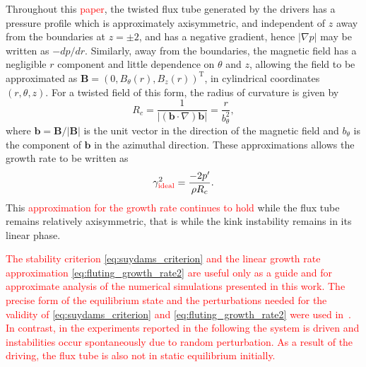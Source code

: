 \documentclass[12pt]{article}
\newcommand{\rs}[2]{\textcolor{red}{#2}}
\renewcommand{\vec}[1]{{\bm #1}}
\begin{document}
Throughout this \rs{chapter}{paper}, the twisted flux tube generated by the drivers has a pressure profile which is approximately axisymmetric, and independent of $z$ away from the boundaries at $z=\pm2$, and has a negative gradient, hence $|\nabla p|$ may be written as $-d p/ dr$. Similarly, away from the boundaries, the magnetic field has a negligible $r$ component and little dependence on $\theta$ and $z$, allowing the field to be approximated as $\vec{B} = (0, B_{\theta}(r), B_z(r))^{\text{T}}$, in cylindrical coordinates $(r, \theta, z)$. For a twisted field of this form, the radius of curvature is given by 
\begin{equation}
  \label{eq:radius_of_curvature}
  R_c = \frac{1}{|(\vec{b}\cdot\nabla) \vec{b}|} = \frac{r}{b_{\theta}^2},
\end{equation}
where $\vec{b} = \vec{B}/|\vec{B}|$ is the unit vector in the direction of the magnetic field and $b_{\theta}$ is the component of $\vec{b}$ in the azimuthal direction. These approximations allows the growth rate to be written as
\begin{equation}
  \label{eq:fluting_growth_rate2}
\gamma_{\rs{{ideal}}{\text{ideal}}}^2 = \frac{-2p'}{\rho R_c}.
\end{equation}
This \rs{growth rate remains applicable}{approximation for the growth rate continues to hold} while the flux tube remains relatively axisymmetric, that is while the kink instability remains in its linear phase.

\rs{In contrast to the precise form of the equilibrium state and
  perturbation studied in~\cite{quinnEffectAnisotropicViscosity2020},
  this is an experiment where a system is driven and instabilities
  occur organically as a result of noise providing a random
  perturbation. As a result of the driving, the flux tube is not in
  static equilibrium. Consequently, the stability criterion and linear
  growth rate presented previously are useful only as a guide and for
  approximate comparison.}{The stability criterion
  \eqref{eq:suydams_criterion} and the linear
  growth rate approximation \eqref{eq:fluting_growth_rate2} are useful
  only as a guide and for 
  approximate analysis of the numerical simulations presented in this
  work.  The precise form of the equilibrium state and the
  perturbations needed for the validity of
  \eqref{eq:suydams_criterion} and \eqref{eq:fluting_growth_rate2}
  were used in~\cite{quinnEffectAnisotropicViscosity2020}.
  In contrast, in the experiments reported in the following the system
  is driven and instabilities occur spontaneously due to random
  perturbation. As a result of the driving, the flux tube is also not
  in static equilibrium initially. }
\end{document}
